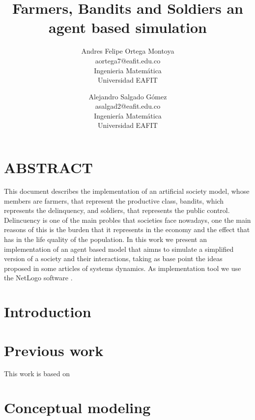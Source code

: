 \documentclass{wscpaperproc}
\theoremstyle{wsc}
\begin{document}

\title{Farmers, Bandits and Soldiers an agent based simulation}

\author{Andres Felipe Ortega Montoya\\ [12pt]
aortega7@eafit.edu.co\\
Ingenieria Matemática\\
Universidad EAFIT\\
\and
Alejandro Salgado Gómez\\[12pt]
asalgad2@eafit.edu.co\\
Ingeniería Matemática\\
Universidad EAFIT\\
}

\maketitle

\section*{ABSTRACT}

This document describes the implementation of an artificial society model,
whose members are farmers, that represent the productive class, bandits,
which represents the delinquency, and soldiers, that represents the public
control. Delincuency is one of the main probles that societies face
nowadays, one the main reasons of this is the burden that it represents in
the economy and the effect that has in the life quality of the 
population. In this work we present an implementation of an agent based
model that aimns to simulate a simplified version of a society and their
interactions, taking as base point the ideas proposed in some articles of
systems dynamics. As implementation tool we use the NetLogo software
\cite{netlogo}.

\section{Introduction}

\section{Previous work}

This work is based on \cite{article1} \cite{article2}

\section{Conceptual modeling}
\end{document}
